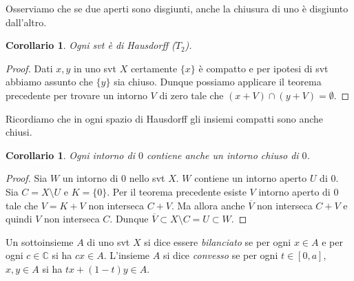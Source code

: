 \documentclass[italian,a4paper,oneside,headinclude]{scrbook}
\newcommand{\CC}{\mathbb C}
\newtheorem{corollary}[theorem]{Corollario}
\begin{document}
Osserviamo che se due aperti sono disgiunti, anche la chiusura di uno
è disgiunto dall'altro.

\begin{corollary}
  Ogni svt è di Hausdorff ($T_2$).
\end{corollary}
\begin{proof}
  Dati $x,y$ in uno svt $X$ certamente $\{x\}$ è compatto e per
  ipotesi di svt abbiamo assunto che $\{y\}$ sia chiuso. Dunque
  possiamo applicare il teorema precedente per trovare un intorno
  $V$ di zero tale che $(x+V) \cap (y+V) = \emptyset$.
\end{proof}

Ricordiamo che in ogni spazio di Hausdorff gli insiemi compatti sono
anche chiusi.

\begin{corollary}
  Ogni intorno di $0$ contiene anche un intorno chiuso di $0$.
\end{corollary}
\begin{proof}
  Sia $W$ un intorno di $0$ nello svt $X$. $W$ contiene un intorno
  aperto $U$ di $0$. Sia $C=X\setminus U$ e
  $K=\{0\}$.
  Per il teorema precedente esiste $V$ intorno aperto di $0$
  tale che $V = K+V$ non interseca $C+V$. Ma allora anche
  $\overline{V}$ non interseca $C+V$ e quindi $V$ non interseca $C$.
  Dunque $\overline{V}\subset X \setminus C = U \subset W$.
\end{proof}

Un sottoinsieme $A$ di uno svt $X$ si dice essere \emph{bilanciato}
se per ogni $x\in A$ e per ogni $c\in \CC$ si ha $cx\in A$.
L'insieme $A$ si dice \emph{convesso}
se per ogni $t\in[0,a]$, $x,y\in A$ si ha $tx+(1-t)y\in A$.
\end{document}

